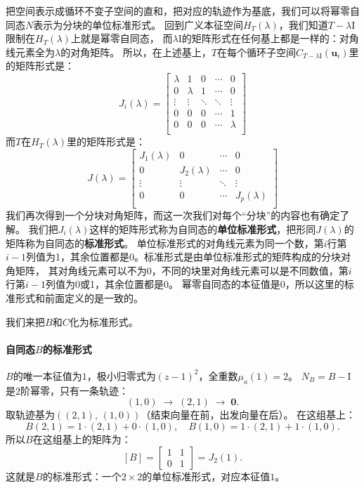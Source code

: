 \documentclass[12pt,UTF8,fontset=none]{ctexbook}
\begin{document}
把空间表示成循环不变子空间的直和，把对应的轨迹作为基底，我们可以将幂零自同态$N$表示为分块的单位标准形式。
回到广义本征空间$H_T(\lambda)$，我们知道$T-\lambda \mathrm{I}$限制在$H_T(\lambda)$上就是幂零自同态，
而$\lambda \mathrm{I}$的矩阵形式在任何基上都是一样的：对角线元素全为$\lambda$的对角矩阵。
所以，在上述基上，$T$在每个循环子空间$C_{T-\lambda \mathrm{I}}(\mathbf{u}_i)$里的矩阵形式是：
$$
J_i(\lambda) = \begin{bmatrix}
     \lambda & 1 & 0 & \cdots & 0 \\
     0 & \lambda & 1 & \cdots & 0 \\
     \vdots & \vdots & \ddots & \ddots & \vdots  \\
     0 & 0 & 0 & \cdots  & 1  \\
     0 & 0 & 0 & \cdots & \lambda \\
    \end{bmatrix}
$$
而$T$在$H_T(\lambda)$里的矩阵形式是：
$$
J(\lambda) = \begin{bmatrix}
     J_1(\lambda) & 0 & \cdots & 0 \\
     0 & J_2(\lambda) & \cdots & 0 \\
     \vdots & \vdots & \ddots  & \vdots  \\
     0 & 0 & \cdots  & J_p(\lambda)  \\
    \end{bmatrix}
$$
我们再次得到一个分块对角矩阵，而这一次我们对每个“分块”的内容也有确定了解。
我们把$J_i(\lambda)$这样的矩阵形式称为自同态的\textbf{单位标准形式}，把形同$J(\lambda)$的矩阵称为自同态的\textbf{标准形式}。
单位标准形式的对角线元素为同一个数，第$i$行第$i-1$列值为1，其余位置都是0。标准形式是由单位标准形式的矩阵构成的分块对角矩阵，
其对角线元素可以不为0，不同的块里对角线元素可以是不同数值，第$i$行第$i-1$列值为0或1，其余位置都是0。
幂零自同态的本征值是0，所以这里的标准形式和前面定义的是一致的。

我们来把$B$和$C$化为标准形式。

\paragraph{自同态$B$的标准形式}

$B$的唯一本征值为$1$，极小归零式为$(z-1)^2$，全重数$\mu_a(1) = 2$。
$N_B = B - \mathrm{I}$是$2$阶幂零，只有一条轨迹：
$$
(1,0) \;\longrightarrow\; (2,1) \;\longrightarrow\; \mathbf{0}.
$$
取轨迹基为$((2,1),\, (1,0))$（结束向量在前，出发向量在后）。
在这组基上：
$$
B(2,1) = 1\cdot(2,1) + 0\cdot(1,0), \quad B(1,0) = 1\cdot(2,1) + 1\cdot(1,0).
$$
所以$B$在这组基上的矩阵为：
$$
[B] = \begin{bmatrix} 1 & 1 \\ 0 & 1 \end{bmatrix} = J_2(1).
$$
这就是$B$的标准形式：一个$2\times 2$的单位标准形式，对应本征值$1$。
\end{document}

